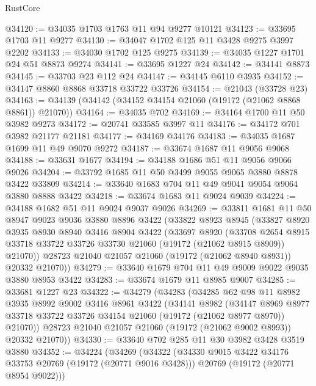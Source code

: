 \begin{lexlean}{RustCore}
\begin{coremodule}
@34120 := @34035 @1703 @1763 @11 @94 @9277 @10121
@34123 := @33695 @1703 @11 @9277
@34130 := @34047 @1702 @125 @11 @3428 @9275 @3997 @2202
@34133 := @34030 @1702 @125 @9275
@34139 := @34035 @1227 @1701 @24 @51 @8873 @9274
@34141 := @33695 @1227 @24
@34142 := @34141 @8873
@34145 := @33703 @23 @112 @24
@34147 := @34145 @6110 @3935
@34152 := @34147 @8860 @8868 @33718 @33722 @33726
@34154 := @21043 (@33728 @23)
@34163 := @34139 (@34142 (@34152 @34154 @21060 (@19172 (@21062 @8868 @8861)) @21070))
@34164 := @34035 @702
@34169 := @34164 @1700 @11 @50 @3982 @9273
@34172 := @20741 @33585 @3997 @11
@34176 := @34172 @701 @3982 @21177 @21181
@34177 := @34169 @34176
@34183 := @34035 @1687 @1699 @11 @49 @9070 @9272
@34187 := @33674 @1687 @11 @9056 @9068
@34188 := @33631 @1677
@34194 := @34188 @1686 @51 @11 @9056 @9066 @9026
@34204 := @33792 @1685 @11 @50 @3499 @9055 @9065 @3880 @8878 @3422 @33809
@34214 := @33640 @1683 @704 @11 @49 @9041 @9054 @9064 @3880 @8888 @3422
@34218 := @33674 @1683 @11 @9024 @9039
@34224 := @34188 @1682 @51 @11 @9024 @9037 @9026
@34269 := @33811
    @1681
    @11
    @50
    @8947
    @9023
    @9036
    @3880
    @8896
    @3422
    (@33822
      @8923
      @8945
      (@33827
        @8920
        @3935
        @8930
        @8940
        @3416
        @8904
        @3422
        (@33697
          @8920
          (@33708
            @2654
            @8915
            @33718
            @33722
            @33726
            @33730
            @21060
            (@19172 (@21062 @8915 @8909))
            @21070))
        @28723
        @21040
        @21057
        @21060
        (@19172 (@21062 @8940 @8931))
        @20332
        @21070))
@34279 := @33640 @1679 @704 @11 @49 @9009 @9022 @9035 @3880 @8953 @3422
@34283 := @33674 @1679 @11 @8985 @9007
@34285 := @33681 @1227 @23
@34322 := @34279
    (@34283
      (@34285
        @62
        @98
        @11
        @8982
        @3935
        @8992
        @9002
        @3416
        @8961
        @3422
        (@34141
          @8982
          (@34147
            @8969
            @8977
            @33718
            @33722
            @33726
            @34154
            @21060
            (@19172 (@21062 @8977 @8970))
            @21070))
        @28723
        @21040
        @21057
        @21060
        (@19172 (@21062 @9002 @8993))
        @20332
        @21070))
@34330 := @33640 @702 @285 @11 @30 @3982 @3428 @3519 @3880
@34352 := @34224
    (@34269
      (@34322
        (@34330 @9015 @3422 @34176 @33753 @20769 (@19172 (@20771 @9016 @3428)))
        @20769
        (@19172 (@20771 @8954 @9022)))

\end{coremodule}
\end{lexlean}
